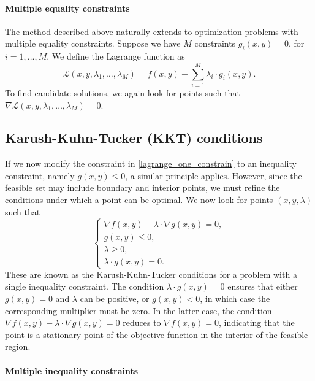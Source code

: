 \documentclass{amsart}
\begin{document}
\bigskip

\paragraph{\bf Multiple equality constraints}

The method described above naturally extends to optimization problems with multiple equality constraints. Suppose we have $M$ constraints $g_i(x,y)=0$, for $i=1,\ldots, M$. We define the Lagrange function as
\[
    \mathcal{L}(x,y,\lambda_1,\ldots,\lambda_M)= f(x,y) -\sum_{i=1}^M \lambda_i\cdot g_i(x,y).
\]
To find candidate solutions, we again look for points such that $\nabla\mathcal{L}(x,y,\lambda_1,\ldots,\lambda_M)=0$.

\subsection{Karush-Kuhn-Tucker (KKT) conditions}

If we now modify the constraint in \eqref{lagrange_one_constrain} to an inequality constraint, namely $g(x,y)\leq 0$, a similar principle applies. However, since the feasible set may include boundary and interior points, we must refine the conditions under which a point can be optimal. We now look for points $(x,y,\lambda)$ such that
\[\begin{cases}
    \nabla f(x,y) -\lambda\cdot \nabla g(x,y)= 0,\\
    g(x,y)\leq 0,\\
    \lambda\geq 0,\\
    \lambda\cdot g(x,y)=0.
\end{cases}\]
These are known as the Karush-Kuhn-Tucker conditions for a problem with a single inequality constraint. The condition $\lambda\cdot g(x,y)=0$ ensures that either $g(x,y)=0$ and $\lambda$ can be positive, or $g(x,y)<0$, in which case the corresponding multiplier must be zero. In the latter case, the condition $\nabla f(x,y) -\lambda\cdot \nabla g(x,y)= 0$ reduces to $\nabla f(x,y)=0$, indicating that the point is a stationary point of the objective function in the interior of the feasible region.

\bigskip

\paragraph{\bf Multiple inequality constraints}
\end{document}
